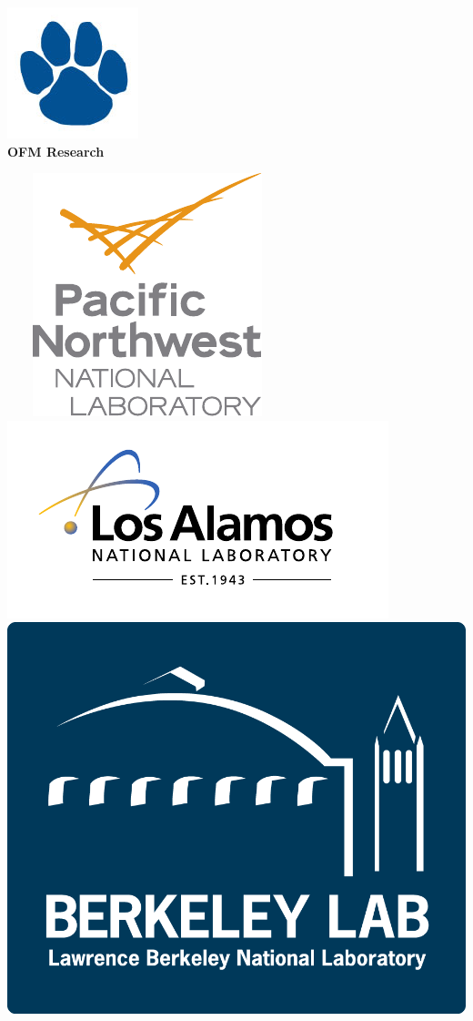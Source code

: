 \begin{center}
\begin{minipage}{1.25in}
\vspace{-15mm}
\includegraphics[scale=0.30]{./logos/paw.jpg}\vspace{-3mm}\\{\footnotesize\bf OFM Research}
\end{minipage} \ \ \ \
\includegraphics[scale=0.45]{./logos/PNNL_Color_Logo_Vertical} \ \ \ \
\includegraphics[scale=0.5]{./logos/lanl} \ \ \ \
\includegraphics[scale=0.2]{./logos/LBNL_Full_Logo_Final} \ \ \ \

\end{center}
